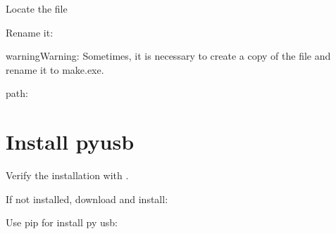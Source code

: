 \documentclass[letterpaper,10pt,english]{sphinxmanual}
\begin{document}
\begin{sphinxVerbatim}[commandchars=\\\{\}]
\PYGZbs{}\PYGZbs{}
\end{sphinxVerbatim}

\sphinxAtStartPar
Locate the file


\sphinxAtStartPar
Rename it:


\begin{sphinxadmonition}{warning}{Warning:}
\sphinxAtStartPar
Sometimes, it is necessary to create a copy of the file and rename it to make.exe.
\end{sphinxadmonition}

\sphinxAtStartPar
path:

\begin{sphinxVerbatim}[commandchars=\\\{\}]
\PYGZbs{}\PYGZbs{}\PYGZbs{}
\end{sphinxVerbatim}



\section{Install pyusb}
\label{\detokenize{install_windows:install-pyusb}}
\sphinxAtStartPar
Verify the installation with .

\sphinxAtStartPar
If not installed, download and install:
\sphinxhyphen{} 

\sphinxAtStartPar
Use pip for install py usb:

\begin{sphinxVerbatim}[commandchars=\\\{\}]
  
\end{sphinxVerbatim}
\end{document}
